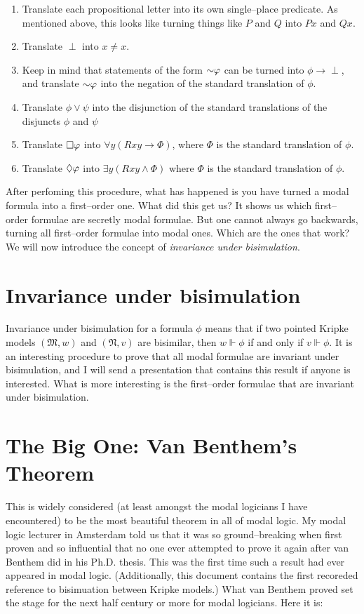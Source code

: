 \begin{enumerate}
    \item Translate each propositional letter into its own single--place predicate. As mentioned above, this looks like
    turning things like $P$ and $Q$ into $Px$ and $Qx$.
    \item Translate $\perp$ into $x \neq x$.
    \item Keep in mind that statements of the form $\mathord{\sim} \varphi$ can be turned into $\phi \rightarrow \perp$, and translate
    $\mathord{\sim} \varphi$ into the negation of the standard translation of $\phi$.
    \item Translate $\phi \vee \psi$ into the disjunction of the standard translations of the disjuncts $\phi$ and $\psi$
    \item Translate $\square \varphi$ into $\forall y (Rxy \rightarrow \Phi)$, where $\Phi$ is the standard translation of $\phi$.
    \item Translate $\lozenge \varphi$ into $\exists y (Rxy \wedge \Phi)$ where $\Phi$ is the standard translation of $\phi$. 
\end{enumerate}

After perfoming this procedure, what has happened is you have turned a modal formula into a first--order one. What did this get us?
It shows us which first--order formulae are secretly modal formulae. But one cannot always go backwards, turning all
first--order formulae into modal ones. Which are the ones that work? We will now introduce the concept of \emph{invariance
under bisimulation}.

\section{Invariance under bisimulation}
Invariance under bisimulation for a formula $\phi$ means that if two pointed Kripke models $(\mathfrak{M}, w)$ and $(\mathfrak{N}, v)$
are bisimilar, then $w \Vdash \phi$ if and only if $v \Vdash \phi$. It is an interesting procedure to prove that all
modal formulae are invariant under bisimulation, and I will send a presentation that contains this result if anyone is interested.
What is more interesting is the first--order formulae that are invariant under bisimulation. 

\section{The Big One: Van Benthem's Theorem}
This is widely considered (at least amongst the modal logicians I have encountered) to be the most beautiful theorem in all of
modal logic. My modal logic lecturer in Amsterdam told us that it was so ground--breaking when first proven and so influential
that no one ever attempted to prove it again after van Benthem did in his Ph.D. thesis. This was the first time such a result
had ever appeared in modal logic. (Additionally, this document contains the first recoreded reference to bisimuation between
Kripke models.) What van Benthem proved set the stage for the next half century or more for modal logicians. Here it is:

